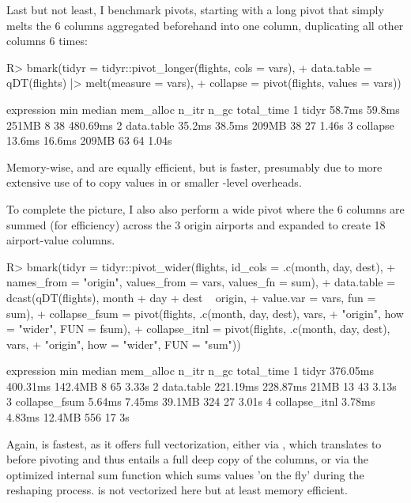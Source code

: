 \documentclass[nojss]{jss} %
\newcommand{\fct}[1]{\code{#1()}}
\begin{document}
Last but not least, I benchmark pivots, starting with a long pivot that simply melts the 6 columns aggregated beforehand into one column, duplicating all other columns 6 times:
%
\begin{Schunk}
\begin{Sinput}
R> bmark(tidyr = tidyr::pivot_longer(flights, cols = vars),
+        data.table = qDT(flights) |> melt(measure = vars),
+        collapse = pivot(flights, values = vars))
\end{Sinput}
\begin{Soutput}
  expression    min median mem_alloc n_itr n_gc total_time
1      tidyr 58.7ms 59.8ms     251MB     8   38   480.69ms
2 data.table 35.2ms 38.5ms     209MB    38   27      1.46s
3   collapse 13.6ms 16.6ms     209MB    63   64      1.04s
\end{Soutput}
\end{Schunk}
%
Memory-wise,  and  are equally efficient, but  is faster, presumably due to more extensive use of  to copy values in  or smaller -level overheads.

To complete the picture, I also also perform a wide pivot where the 6 columns are summed (for efficiency) across the 3 origin airports and expanded to create 18 airport-value columns.
%
\begin{Schunk}
\begin{Sinput}
R> bmark(tidyr = tidyr::pivot_wider(flights, id_cols = .c(month, day, dest),
+            names_from = "origin", values_from = vars, values_fn = sum),
+        data.table = dcast(qDT(flights), month + day + dest ~ origin,
+                           value.var = vars, fun = sum),
+        collapse_fsum = pivot(flights, .c(month, day, dest), vars,
+                              "origin", how = "wider", FUN = fsum),
+        collapse_itnl = pivot(flights, .c(month, day, dest), vars,
+                              "origin", how = "wider", FUN = "sum"))
\end{Sinput}
\begin{Soutput}
     expression      min   median mem_alloc n_itr n_gc total_time
1         tidyr 376.05ms 400.31ms   142.4MB     8   65      3.33s
2    data.table 221.19ms 228.87ms      21MB    13   43      3.13s
3 collapse_fsum   5.64ms   7.45ms    39.1MB   324   27      3.01s
4 collapse_itnl   3.78ms   4.83ms    12.4MB   556   17         3s
\end{Soutput}
\end{Schunk}
%
Again,  is fastest, as it offers full vectorization, either via \fct{fsum}, which translates to  before pivoting and thus entails a full deep copy of the  columns, or via the optimized internal sum function which sums values 'on the fly' during the reshaping process.  is not vectorized here but at least memory efficient. %
\end{document}
